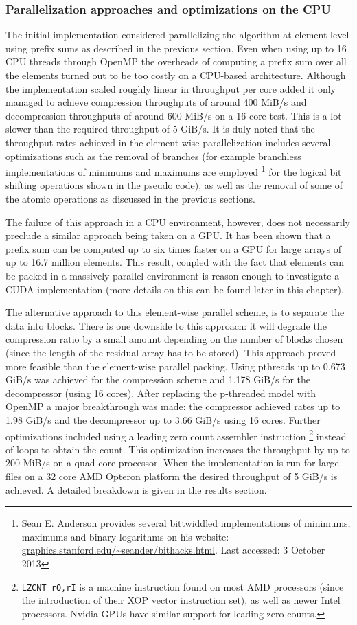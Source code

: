   \subsubsection{Parallelization approaches and optimizations on the CPU}
  The initial implementation considered parallelizing the algorithm at element level using prefix sums as described in the previous section. Even when using up to 16 CPU threads through OpenMP the overheads of computing a prefix 
  sum over all the elements turned out to be too costly on a CPU-based architecture. Although the implementation scaled roughly linear in throughput per core added it only managed to achieve compression throughputs of around 
  400 MiB/s and decompression throughputs of around 600 MiB/s on a 16 core test. This is a lot slower than the required throughput of 5 GiB/s. It is duly noted that the throughput rates achieved in the element-wise parallelization 
  includes several optimizations such as the removal of branches (for example branchless implementations of minimums and maximums are employed \footnote{Sean E. Anderson 
  provides several bittwiddled implementations of minimums, maximums and binary logarithms on his website: \url{graphics.stanford.edu/~seander/bithacks.html}. Last accessed: 3 
  October 2013} for the logical bit shifting operations shown in the pseudo code), as well as the removal of some of the atomic operations as discussed in the previous sections.
  
  The failure of this approach in a CPU environment, however, does not necessarily preclude a similar approach being taken on a GPU. It has been shown \cite{harris2007parallel} that a 
  prefix sum can be computed up to six times faster on a GPU for large arrays of up to 16.7 million elements. This result, coupled with the fact that elements can be packed in a massively
  parallel environment is reason enough to investigate a CUDA implementation (more details on this can be found later in this chapter).
  
  The alternative approach to this element-wise parallel scheme, is to separate the data into blocks. There is one downside to this approach: it will degrade the compression
  ratio by a small amount depending on the number of blocks chosen (since the length of the residual array has to be stored). This approach proved more feasible than the 
  element-wise parallel packing. Using pthreads up to 0.673 GiB/s was achieved for the compression scheme and 1.178 GiB/s for the decompressor (using 16 cores). After replacing
  the p-threaded model with OpenMP a major breakthrough was made: the compressor achieved rates up to 1.98 GiB/s and the decompressor up to 3.66 GiB/s using 16 cores. Further 
  optimizations included using a leading zero count assembler instruction \footnote{\texttt{LZCNT rO,rI} is a machine instruction found on most AMD processors (since the 
  introduction of their XOP vector instruction set), as well as newer Intel processors. Nvidia GPUs have similar support for leading zero counts.} instead of loops to obtain 
  the count. This optimization increases the throughput by up to 200 MiB/s on a quad-core processor. When the implementation is run for large files on a 32 core AMD Opteron platform
  the desired throughput of 5 GiB/s is achieved. A detailed breakdown is given in the results section.
